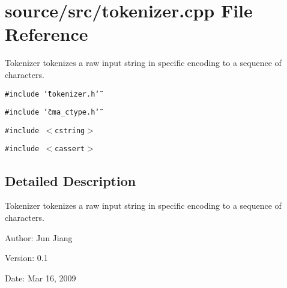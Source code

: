 \section{source/src/tokenizer.cpp File Reference}
\label{tokenizer_8cpp}
Tokenizer tokenizes a raw input string in specific encoding to a sequence of characters.  


{\tt \#include \char`\"{}tokenizer.h\char`\"{}}\par
{\tt \#include \char`\"{}cma\_\-ctype.h\char`\"{}}\par
{\tt \#include $<$cstring$>$}\par
{\tt \#include $<$cassert$>$}\par


\subsection{Detailed Description}
Tokenizer tokenizes a raw input string in specific encoding to a sequence of characters. 

\begin{Desc}
\item[Author:]Jun Jiang \end{Desc}
\begin{Desc}
\item[Version:]0.1 \end{Desc}
\begin{Desc}
\item[Date:]Mar 16, 2009 \end{Desc}
